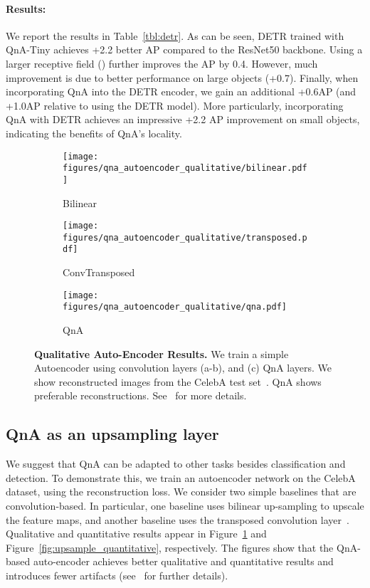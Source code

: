\paragraph{Results: } We report the results in Table~\ref{tbl:detr}. As can be seen, DETR trained with QnA-Tiny achieves +2.2 better AP compared to the ResNet50 backbone. Using a larger receptive field () further improves the AP by 0.4. However, much improvement is due to better performance on large objects (+0.7). Finally, when incorporating QnA into the DETR encoder, we gain an additional +0.6AP (and +1.0AP relative to using the DETR model). More particularly, incorporating QnA with DETR achieves an impressive +2.2 AP improvement on small objects, indicating the benefits of QnA's locality.

\begin{figure}
    \centering
    \begin{subfigure}{0.3\linewidth}
        \centering
        \texttt{[image: figures/qna\_autoencoder\_qualitative/bilinear.pdf]}
        \caption{Bilinear}
    \end{subfigure}
        \begin{subfigure}{0.3\linewidth}
        \centering
        \texttt{[image: figures/qna\_autoencoder\_qualitative/transposed.pdf]}
        \caption{ConvTransposed}
    \end{subfigure}
        \begin{subfigure}{0.3\linewidth}
        \centering
        \texttt{[image: figures/qna\_autoencoder\_qualitative/qna.pdf]}
        \caption{QnA}
    \end{subfigure}
    \caption{\textbf{Qualitative Auto-Encoder Results.} We train a simple Autoencoder using convolution layers (a-b), and (c) QnA layers. We show reconstructed images from the CelebA test set~\cite{CelebA}. QnA shows preferable reconstructions. See~ for more details.}
    \label{fig:upsample_qualitative}
\end{figure} \subsection{QnA as an upsampling layer}
\label{sec:qna_upsample}
We suggest that QnA can be adapted to other tasks besides classification and detection. To demonstrate this, we train an autoencoder network on the CelebA~\cite{CelebA} dataset, using the  reconstruction loss. We consider two simple baselines that are convolution-based. In particular, one baseline uses bilinear up-sampling to upscale the feature maps, and another baseline uses the transposed convolution layer~\cite{DeConv}. Qualitative and quantitative results appear in Figure~\ref{fig:upsample_qualitative} and Figure~\ref{fig:upsample_quantitative}, respectively. The figures show that the QnA-based auto-encoder achieves better qualitative and quantitative results and introduces fewer artifacts (see~ for further details). 
